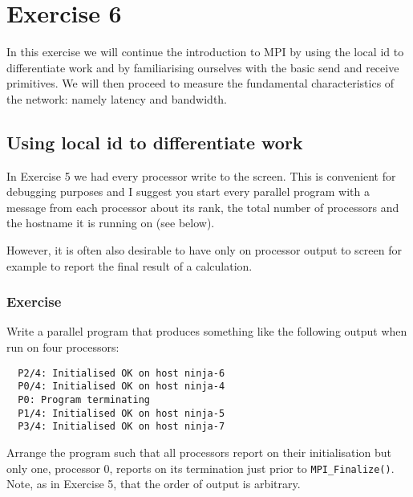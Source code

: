 \documentclass[12pt]{article}
\begin{document}
\section*{Exercise 6}

In this exercise we will continue the introduction to MPI
by using the local id to differentiate work and
by familiarising ourselves with the basic send and receive
primitives.
We will then proceed to measure the fundamental characteristics of
the network: namely latency and bandwidth.



\subsection*{Using local id to differentiate work}
In Exercise 5 we had every processor write to the screen. This
is convenient for debugging purposes
and I suggest you start every parallel program
with a message from each processor about its rank, the total number
of processors and the hostname it is running on (see below).

However, it is often also desirable to have only on
processor output to screen
for example to report the final result of a calculation.

\subsubsection*{Exercise}
Write a parallel program that
produces something like the following output when run on four processors:
\begin{verbatim}
  P2/4: Initialised OK on host ninja-6
  P0/4: Initialised OK on host ninja-4
  P0: Program terminating
  P1/4: Initialised OK on host ninja-5
  P3/4: Initialised OK on host ninja-7
\end{verbatim}
Arrange the program such that
all processors report on their initialisation but
only one, processor 0, reports on its termination just prior
to \texttt{MPI\_Finalize()}.
Note, as in Exercise 5, that the order of output is
arbitrary.
\end{document}
